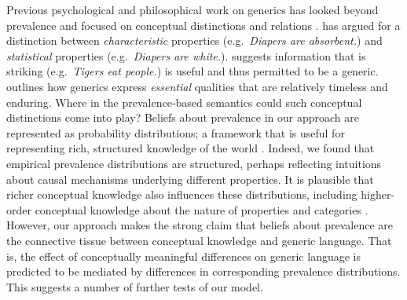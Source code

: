 \documentclass[10pt,letterpaper]{article}
\begin{document}
Previous psychological and philosophical work on generics has looked beyond prevalence and focused on conceptual distinctions and relations \cite{Gelman2005, Prasada2013, Leslie2007, Leslie2008}. 
\citeauthor{Prasada2013} has argued for a distinction between \emph{characteristic} properties (e.g.~\emph{Diapers are absorbent.}) and \emph{statistical} properties (e.g.~\emph{Diapers are white.}).
\citeauthor{Leslie2007} suggests information that is striking (e.g.~\emph{Tigers eat people.}) is useful and thus permitted to be a generic.
\citeauthor{Gelman2005} outlines how generics express \emph{essential} qualities that are relatively timeless and enduring. %
Where in the prevalence-based semantics could such conceptual distinctions come into play?
Beliefs about prevalence in our approach are represented as probability distributions; a framework that is useful for representing rich, structured knowledge of the world \cite{Goodmanconcepts}. 
Indeed, we found that empirical prevalence distributions are structured, perhaps reflecting intuitions about causal mechanisms underlying different properties.
It is plausible that richer conceptual knowledge also influences these distributions, including higher-order conceptual knowledge about the nature of properties and categories \cite{Gelman2005, Keil1992}. 
However, our approach makes the strong claim that beliefs about prevalence are the connective tissue between conceptual knowledge and generic language.
That is, the effect of conceptually meaningful differences on generic language is predicted to be mediated by differences in corresponding prevalence distributions.
This suggests a number of further tests of our model.


\end{document}
